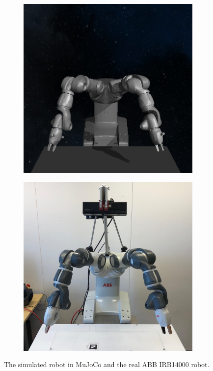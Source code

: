 \begin{figure}%
    \centering
    \begin{subfigure}{0.4\textwidth}
    \includegraphics[width=1\textwidth]{img/yumi/yumi-pose-sim}
    \end{subfigure}
    \begin{subfigure}{0.4\textwidth}
    \includegraphics[width=1\textwidth]{img/yumi/yumi-pose-real}
    \end{subfigure}
    \caption{The simulated robot in MuJoCo and the real ABB IRB14000 robot.}
    \label{fig:robots}%
\end{figure}

